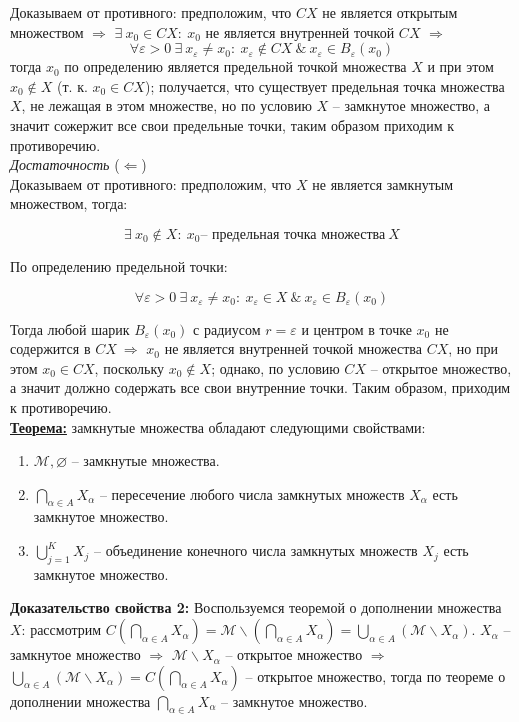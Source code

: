 \documentclass[a4paper,12pt]{article} %
\begin{document}
	Доказываем от противного: предположим, что $CX$ не является открытым множеством $\Rightarrow$ $\exists ~ x_0 \in CX : ~ x_0$ не является внутренней точкой $CX$ $\Rightarrow$ 
	\[\forall \varepsilon > 0 ~ \exists ~ x_{\varepsilon} \neq x_0 : ~ x_{\varepsilon} \notin CX ~ \& ~ x_{\varepsilon} \in B_{\varepsilon}(x_0)\]
	тогда $x_0$ по определению является предельной точкой множества $X$ и при этом $x_0 \notin X$ (т. к. $x_0 \in CX$); получается, что существует предельная точка множества $X$, не лежащая в этом множестве, но по условию $X$ -- замкнутое множество, а значит сожержит все свои предельные точки, таким образом приходим к противоречию.\\
	
	\textit{Достаточность} ($\Leftarrow$)\\
	
	Доказываем от противного: предположим, что $X$ не является замкнутым множеством, тогда:
	
	\[ \exists ~ x_0 \notin X : ~ x_0 \text{-- предельная точка множества} ~ X \]
	
	По определению предельной точки:
	
	\[ \forall \varepsilon > 0 ~ \exists ~ x_{\varepsilon} \neq x_0 : ~ x_{\varepsilon} \in X ~ \& ~ x_{\varepsilon} \in B_{\varepsilon}(x_0) \]
	
	Тогда любой шарик $B_{\varepsilon}(x_0)$ с радиусом $r = \varepsilon$ и центром в точке $x_0$ не содержится в $CX ~ \Rightarrow$ $x_0$ не является внутренней точкой множества $CX$, но при этом $x_0 \in CX$, поскольку $x_0 \notin X$; однако, по условию $CX$ -- открытое множество, а значит должно содержать все свои внутренние точки. Таким образом, приходим к противоречию.\\
	
	\underline{\textbf{Теорема:}} замкнутые множества обладают следующими свойствами:
	
	\begin{enumerate}
		\item $\mathscr{M}, \varnothing$ -- замкнутые множества.
		\item $\bigcap \limits_{\alpha \in A} X_{\alpha}$ -- пересечение любого числа замкнутых множеств $X_{\alpha}$ есть замкнутое множество.
		\item $\bigcup \limits_{j = 1}^K X_j$ -- объединение конечного числа замкнутых множеств $X_j$ есть замкнутое множество.
	\end{enumerate}
	
	\textbf{Доказательство свойства 2:} Воспользуемся теоремой о дополнении множества $X$: рассмотрим $C(\bigcap \limits_{\alpha \in A} X_{\alpha}) = \mathscr{M} \backslash (\bigcap \limits_{\alpha \in A} X_{\alpha}) = \bigcup \limits_{\alpha \in A} (\mathscr{M} \backslash X_{\alpha})$. $X_{\alpha}$ -- замкнутое множество $\Rightarrow$ $\mathscr{M} \backslash X_{\alpha}$ -- открытое множество $\Rightarrow$ $\bigcup \limits_{\alpha \in A} (\mathscr{M} \backslash X_{\alpha}) = C(\bigcap \limits_{\alpha \in A} X_{\alpha})$ -- открытое множество, тогда по теореме о дополнении множества $\bigcap \limits_{\alpha \in A} X_{\alpha}$ -- замкнутое множество.\\
	
\end{document}
